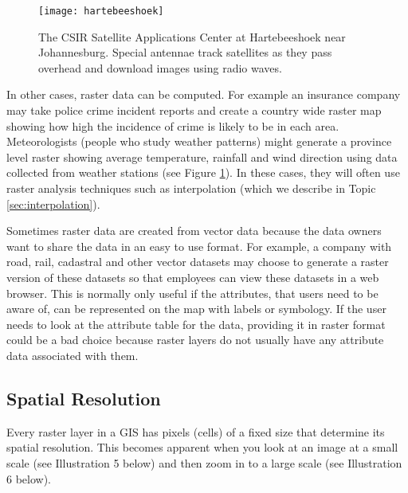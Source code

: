 \begin{figure}[ht]
   \begin{center}
   \caption{The CSIR Satellite Applications Center at Hartebeeshoek near
Johannesburg. Special antennae track satellites as they pass overhead and
download images using radio waves.}
\label{fig:csir}\smallskip
   \texttt{[image: hartebeeshoek]}
\end{center}
\end{figure}

In other cases, raster data can be computed. For example an insurance company
may take police crime incident reports and create a country wide raster map
showing how high the incidence of crime is likely to be in each area.
Meteorologists (people who study weather patterns) might generate a  province
level raster showing average temperature, rainfall and wind direction using
data collected from weather stations (see Figure \ref{fig:csir}). In these
cases, they will often use raster analysis techniques such as interpolation
(which we describe in Topic \ref{sec:interpolation}).

Sometimes raster data are created from vector data because the data owners
want to share the data in an easy to use format. For example, a company with
road, rail, cadastral and other vector datasets may choose to generate a
raster version of these datasets so that employees can view these datasets in
a web browser. This is normally only useful if the attributes, that users
need to be aware of, can be represented on the map with labels or symbology.
If the user needs to look at the attribute table for the data, providing it
in raster format could be a bad choice because raster layers do not usually
have any attribute data associated with them.

\subsection{Spatial Resolution}

Every raster layer in a GIS has pixels (cells) of a fixed size that determine
its  spatial resolution. This becomes apparent when you look at an image at a
small scale (see Illustration 5 below) and then zoom in to a large scale (see
Illustration 6 below).

